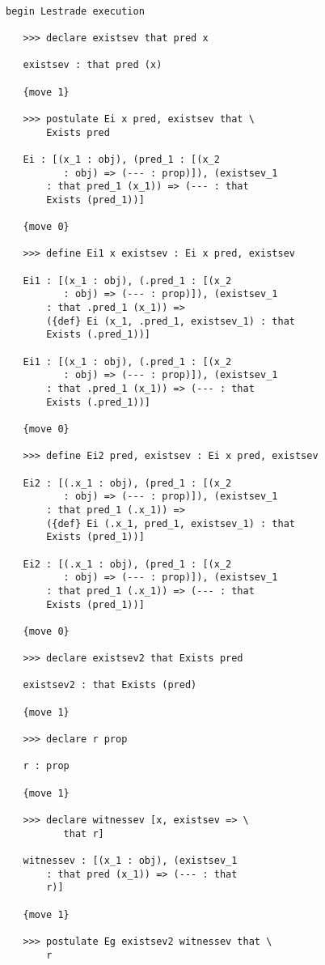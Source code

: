 \documentclass[12pt]{article}
\begin{document}
\begin{verbatim}

begin Lestrade execution

   >>> declare existsev that pred x

   existsev : that pred (x)

   {move 1}

   >>> postulate Ei x pred, existsev that \
       Exists pred

   Ei : [(x_1 : obj), (pred_1 : [(x_2 
          : obj) => (--- : prop)]), (existsev_1 
       : that pred_1 (x_1)) => (--- : that 
       Exists (pred_1))]

   {move 0}

   >>> define Ei1 x existsev : Ei x pred, existsev

   Ei1 : [(x_1 : obj), (.pred_1 : [(x_2 
          : obj) => (--- : prop)]), (existsev_1 
       : that .pred_1 (x_1)) => 
       ({def} Ei (x_1, .pred_1, existsev_1) : that 
       Exists (.pred_1))]

   Ei1 : [(x_1 : obj), (.pred_1 : [(x_2 
          : obj) => (--- : prop)]), (existsev_1 
       : that .pred_1 (x_1)) => (--- : that 
       Exists (.pred_1))]

   {move 0}

   >>> define Ei2 pred, existsev : Ei x pred, existsev

   Ei2 : [(.x_1 : obj), (pred_1 : [(x_2 
          : obj) => (--- : prop)]), (existsev_1 
       : that pred_1 (.x_1)) => 
       ({def} Ei (.x_1, pred_1, existsev_1) : that 
       Exists (pred_1))]

   Ei2 : [(.x_1 : obj), (pred_1 : [(x_2 
          : obj) => (--- : prop)]), (existsev_1 
       : that pred_1 (.x_1)) => (--- : that 
       Exists (pred_1))]

   {move 0}

   >>> declare existsev2 that Exists pred

   existsev2 : that Exists (pred)

   {move 1}

   >>> declare r prop

   r : prop

   {move 1}

   >>> declare witnessev [x, existsev => \
          that r]

   witnessev : [(x_1 : obj), (existsev_1 
       : that pred (x_1)) => (--- : that 
       r)]

   {move 1}

   >>> postulate Eg existsev2 witnessev that \
       r


\end{verbatim}
\end{document}
